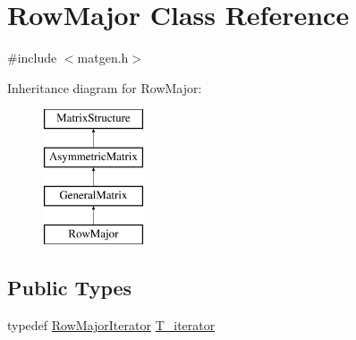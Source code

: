 \hypertarget{classRowMajor}{}\section{Row\+Major Class Reference}
\label{classRowMajor}


{\ttfamily \#include $<$matgen.\+h$>$}

Inheritance diagram for Row\+Major\+:\begin{figure}[H]
\begin{center}
\leavevmode
\includegraphics[height=4.000000cm]{classRowMajor}
\end{center}
\end{figure}
\subsection*{Public Types}
\begin{DoxyCompactItemize}
\item 
typedef \hyperlink{classRowMajorIterator}{Row\+Major\+Iterator} \hyperlink{classRowMajor_ab2fbe61409740e91b674de66e515b05f}{T\+\_\+iterator}
\end{DoxyCompactItemize}
